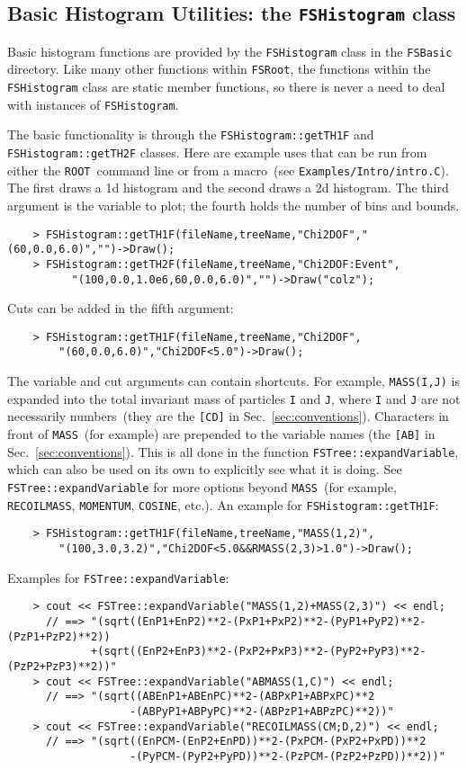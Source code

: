 \documentclass[11pt]{article}
\newcommand{\FSR}{{\tt FSRoot}}
\newcommand{\ROOT}{{\tt ROOT}}
\begin{document}
\subsection{Basic Histogram Utilities: the {\tt FSHistogram} class}
\label{sec:hist}

Basic histogram functions are provided by the {\tt FSHistogram} class in the {\tt FSBasic} directory.  Like many other functions within \FSR, the functions within the {\tt FSHistogram} class are static member functions, so there is never a need to deal with instances of {\tt FSHistogram}.

The basic functionality is through the {\tt FSHistogram::getTH1F} and {\tt FSHistogram::getTH2F} classes.  Here are example uses that can be run from either the \ROOT\ command line or from a macro~(see {\tt Examples/Intro/intro.C}).  The first draws a 1d histogram and the second draws a 2d histogram.  The third argument is the variable to plot; the fourth holds the number of bins and bounds.
\begin{verbatim}
    > FSHistogram::getTH1F(fileName,treeName,"Chi2DOF","(60,0.0,6.0)","")->Draw();
    > FSHistogram::getTH2F(fileName,treeName,"Chi2DOF:Event",
          "(100,0.0,1.0e6,60,0.0,6.0)","")->Draw("colz");
\end{verbatim}
Cuts can be added in the fifth argument:
\begin{verbatim}
    > FSHistogram::getTH1F(fileName,treeName,"Chi2DOF",
        "(60,0.0,6.0)","Chi2DOF<5.0")->Draw();
\end{verbatim}
The variable and cut arguments can contain shortcuts.  For example, {\tt MASS(I,J)} is expanded into the total invariant mass of particles {\tt I} and {\tt J}, where {\tt I} and {\tt J} are not necessarily numbers~(they are the {\tt [CD]} in Sec.~\ref{sec:conventions}).  Characters in front of {\tt MASS}~(for example) are prepended to the variable names (the {\tt [AB]} in Sec.~\ref{sec:conventions}).  This is all done in the function {\tt FSTree::expandVariable}, which can also be used on its own to explicitly see what it is doing.    See {\tt FSTree::expandVariable} for more options beyond {\tt MASS}~(for example, {\tt RECOILMASS}, {\tt MOMENTUM}, {\tt COSINE}, etc.).  An example for {\tt FSHistogram::getTH1F}:
\begin{verbatim}
    > FSHistogram::getTH1F(fileName,treeName,"MASS(1,2)",
        "(100,3.0,3.2)","Chi2DOF<5.0&&RMASS(2,3)>1.0")->Draw();
\end{verbatim}
Examples for {\tt FSTree::expandVariable}:
\begin{verbatim}
    > cout << FSTree::expandVariable("MASS(1,2)+MASS(2,3)") << endl;
      // ==> "(sqrt((EnP1+EnP2)**2-(PxP1+PxP2)**2-(PyP1+PyP2)**2-(PzP1+PzP2)**2))
             +(sqrt((EnP2+EnP3)**2-(PxP2+PxP3)**2-(PyP2+PyP3)**2-(PzP2+PzP3)**2))"
    > cout << FSTree::expandVariable("ABMASS(1,C)") << endl;
      // ==> "(sqrt((ABEnP1+ABEnPC)**2-(ABPxP1+ABPxPC)**2
                   -(ABPyP1+ABPyPC)**2-(ABPzP1+ABPzPC)**2))"
    > cout << FSTree::expandVariable("RECOILMASS(CM;D,2)") << endl;
      // ==> "(sqrt((EnPCM-(EnP2+EnPD))**2-(PxPCM-(PxP2+PxPD))**2
                   -(PyPCM-(PyP2+PyPD))**2-(PzPCM-(PzP2+PzPD))**2))"
\end{verbatim}
\end{document}
